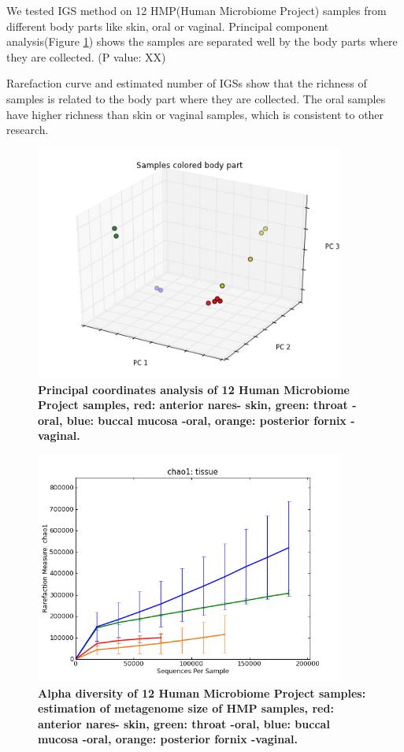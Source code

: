 We tested IGS method on 12 HMP(Human Microbiome Project) samples from 
different body parts like skin, oral or vaginal. 
Principal component analysis(Figure \ref{fig:HMP_beta}) shows the samples are 
separated well by the body parts where they are collected. (P value: XX)

Rarefaction curve and estimated number of IGSs show that the richness of 
samples is related to the body part where they are collected. The 
oral samples have higher richness than skin or vaginal samples, 
which is consistent  to other research. \cite{Human-Microbiome-Project-Consortium:2012aa}



\begin{figure}[!ht]
 \centerline{\includegraphics[width=4in]{./figures/HMP_beta.png}}
\caption{\bf Principal coordinates analysis of 12 Human Microbiome Project
samples, red: anterior nares- skin, green: throat -oral, blue: buccal mucosa -oral, orange: 
posterior fornix -vaginal.}
\label{fig:HMP_beta}
\end{figure}

\begin{figure}[!ht]
 \centerline{\includegraphics[width=4in]{./figures/HMP_alpha.png}}
\caption{\bf Alpha diversity of 12 Human Microbiome Project samples:
 estimation of metagenome size of HMP samples,
red: anterior nares- skin, green: throat -oral, blue: buccal mucosa -oral, orange: 
posterior fornix -vaginal.}
\label{fig:HMP_alpha}
\end{figure}






